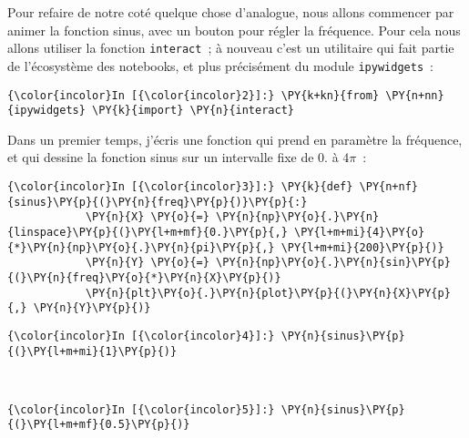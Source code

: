     Pour refaire de notre coté quelque chose d'analogue, nous allons
commencer par animer la fonction sinus, avec un bouton pour régler la
fréquence. Pour cela nous allons utiliser la fonction
\texttt{interact}~; à nouveau c'est un utilitaire qui fait partie de
l'écosystème des notebooks, et plus précisément du module
\texttt{ipywidgets}~:

    \begin{Verbatim}[commandchars=\\\{\}]
{\color{incolor}In [{\color{incolor}2}]:} \PY{k+kn}{from} \PY{n+nn}{ipywidgets} \PY{k}{import} \PY{n}{interact}
\end{Verbatim}


    Dans un premier temps, j'écris une fonction qui prend en paramètre la
fréquence, et qui dessine la fonction sinus sur un intervalle fixe de 0.
à \(4\pi\)~:

    \begin{Verbatim}[commandchars=\\\{\}]
{\color{incolor}In [{\color{incolor}3}]:} \PY{k}{def} \PY{n+nf}{sinus}\PY{p}{(}\PY{n}{freq}\PY{p}{)}\PY{p}{:}
            \PY{n}{X} \PY{o}{=} \PY{n}{np}\PY{o}{.}\PY{n}{linspace}\PY{p}{(}\PY{l+m+mf}{0.}\PY{p}{,} \PY{l+m+mi}{4}\PY{o}{*}\PY{n}{np}\PY{o}{.}\PY{n}{pi}\PY{p}{,} \PY{l+m+mi}{200}\PY{p}{)}
            \PY{n}{Y} \PY{o}{=} \PY{n}{np}\PY{o}{.}\PY{n}{sin}\PY{p}{(}\PY{n}{freq}\PY{o}{*}\PY{n}{X}\PY{p}{)}
            \PY{n}{plt}\PY{o}{.}\PY{n}{plot}\PY{p}{(}\PY{n}{X}\PY{p}{,} \PY{n}{Y}\PY{p}{)}
\end{Verbatim}


    \begin{Verbatim}[commandchars=\\\{\}]
{\color{incolor}In [{\color{incolor}4}]:} \PY{n}{sinus}\PY{p}{(}\PY{l+m+mi}{1}\PY{p}{)}
\end{Verbatim}


    \begin{center}
    \end{center}
    { \hspace*{\fill} \\}
    
    \begin{Verbatim}[commandchars=\\\{\}]
{\color{incolor}In [{\color{incolor}5}]:} \PY{n}{sinus}\PY{p}{(}\PY{l+m+mf}{0.5}\PY{p}{)}
\end{Verbatim}


